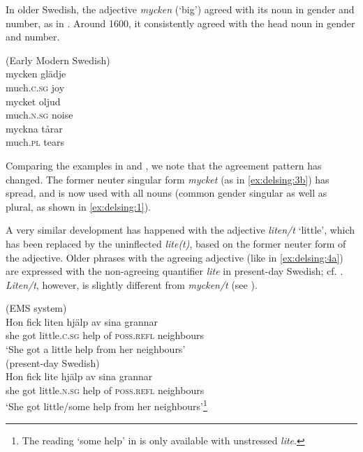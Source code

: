 \documentclass[output=paper]{langscibook}
\begin{document}
In older Swedish, the adjective \textit{mycken} (‘big’) agreed with its noun in gender and number, as in . Around 1600, it consistently agreed with the head noun in gender and number.


\ea(Early Modern Swedish)\\\label{ex:delsing:3}
\ea\label{ex:delsing:3a}
\gll mycken      glädje\\
much\textsc{.c.sg}    joy \\
\ex\label{ex:delsing:3b}
\gll mycket          oljud\\
    much\textsc{.n.sg}    noise \\
\ex\label{ex:delsing:3c}
\gll myckna      tårar \\
    much\textsc{.pl}  tears \\
\z
\z

Comparing the examples in  and , we note that the agreement pattern has changed. The former neuter singular form \textit{mycket} (as in \ref{ex:delsing:3b}) has spread, and is now used with all nouns (common gender singular as well as plural, as shown in \ref{ex:delsing:1}).\largerpage[2.5]



A very similar development has happened with the adjective \textit{liten/t} ‘little’, which has been replaced by the uninflected \textit{lite(t)}, based on the former neuter form of the adjective. Older phrases with the agreeing adjective (like in \ref{ex:delsing:4a}) are expressed with the non-agreeing quantifier \textit{lite} in present-day Swedish; cf. . \textit{Liten/t}, however, is  slightly different from \textit{mycken/t} (see ).


\ea\label{ex:delsing:4}
\ea\label{ex:delsing:4a}(EMS system)\\
\gll Hon  fick    liten        hjälp  av  sina          grannar\\
she      got  little.\textsc{c.sg}    help  of    \textsc{poss.refl}    neighbours\\
     \glt ‘She got a little help from her neighbours’\\

\ex\label{ex:delsing:4b}(present-day Swedish)\\
\gll Hon    fick    lite        hjälp    av  sina        grannar    \\
      she      got    little.\textsc{n.sg}  help    of  \textsc{poss.refl}  neighbours\\
      \glt ‘She got little/some help from her neighbours’\footnote{The reading ‘some help’ in  is only available with unstressed \textit{lite}.}\\
\z
\z
\end{document}
